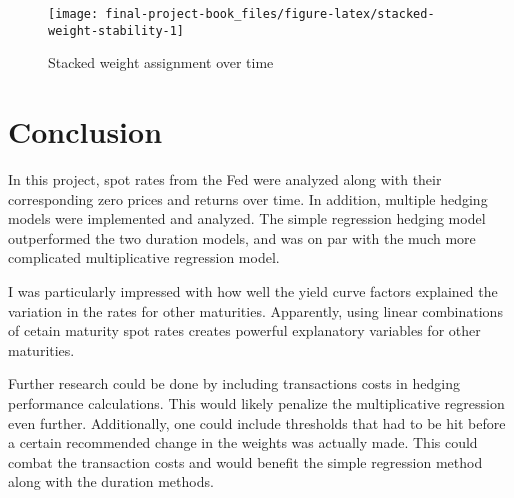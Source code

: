 \documentclass[openany]{book}
\theoremstyle{definition}
\theoremstyle{definition}
\theoremstyle{definition}
\theoremstyle{remark}
\begin{document}
\small

\begin{figure}[H]

{\centering \texttt{[image: final-project-book\_files/figure-latex/stacked-weight-stability-1]} 

}

\caption{Stacked weight assignment over time}\label{fig:stacked-weight-stability}
\end{figure}

\normalsize

\small

\normalsize

\hypertarget{conclusion}{%
\chapter{Conclusion}\label{conclusion}}

In this project, spot rates from the Fed were analyzed along with their
corresponding zero prices and returns over time. In addition, multiple
hedging models were implemented and analyzed. The simple regression
hedging model outperformed the two duration models, and was on par with
the much more complicated multiplicative regression model.

I was particularly impressed with how well the yield curve factors
explained the variation in the rates for other maturities. Apparently,
using linear combinations of cetain maturity spot rates creates powerful
explanatory variables for other maturities.

Further research could be done by including transactions costs in
hedging performance calculations. This would likely penalize the
multiplicative regression even further. Additionally, one could include
thresholds that had to be hit before a certain recommended change in the
weights was actually made. This could combat the transaction costs and
would benefit the simple regression method along with the duration
methods.


\end{document}
